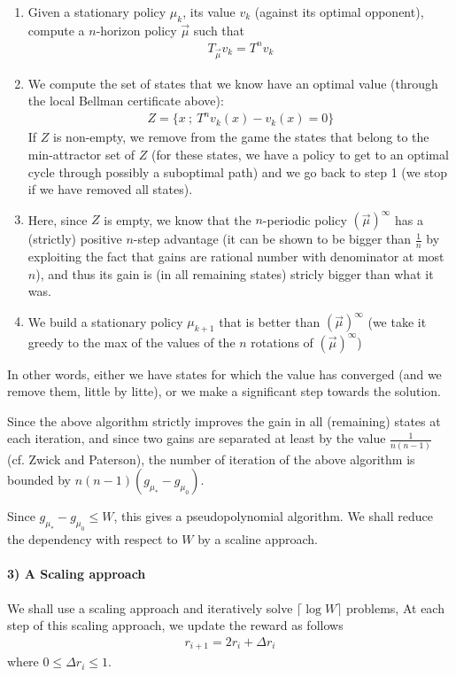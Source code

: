 \documentclass{article}
\begin{document}
\begin{enumerate}
  \item Given a stationary policy $\mu_k$, its value $v_k$ (against its optimal opponent), compute a $n$-horizon policy $\vec\mu$ such that
  \begin{align}
    T_{\vec\mu} v_k = T^n v_k
  \end{align}
  \item  We compute the set of states that we know have an optimal value (through the local Bellman certificate above):
  \begin{align}
    Z = \{ x ~;~ T^n v_k(x)-v_k(x)=0 \}
  \end{align}
   If $Z$ is non-empty, we remove from the game the states that belong to the min-attractor set of $Z$ (for these states, we have a policy to get to an optimal cycle through possibly a suboptimal path) and we go back to step 1 (we stop if we have removed all states).
\item Here, since $Z$ is empty, we know that the $n$-periodic policy $(\vec\mu)^\infty$ has a (strictly) positive $n$-step advantage (it can be shown to be bigger than $\frac{1}{n}$ by exploiting the fact that gains are rational number with denominator at most $n$), and thus its gain is (in all remaining states) stricly bigger than what it was.
  \item We build a stationary policy $\mu_{k+1}$  that is better than $(\vec\mu)^\infty$ (we take it greedy to the max of the values of the $n$ rotations of $(\vec\mu)^\infty$)
\end{enumerate}
In other words, either we have states for which the value has converged (and we remove them, little by litte), or we make a significant step towards the solution.

Since the above algorithm strictly improves the gain in all (remaining) states at each iteration, and since two gains are separated at least by the value $\frac{1}{n(n-1)}$ (cf. Zwick and Paterson), the number of iteration of the above algorithm is bounded by $n(n-1) (g_{\mu_*}-g_{\mu_0})$.

Since $g_{\mu_*}-g_{\mu_0} \le W$, this gives a pseudopolynomial algorithm. We shall reduce the dependency with respect to $W$ by a scaline approach.

\paragraph{3) A Scaling approach}

We shall use a scaling approach and iteratively solve $\lceil \log W \rceil$ problems,
At each step of this scaling approach, we update the reward as follows
\begin{align}
  r_{i+1} = 2r_i + \Delta r_i
\end{align}
where $0 \le \Delta r_i \le 1$.
\end{document}

